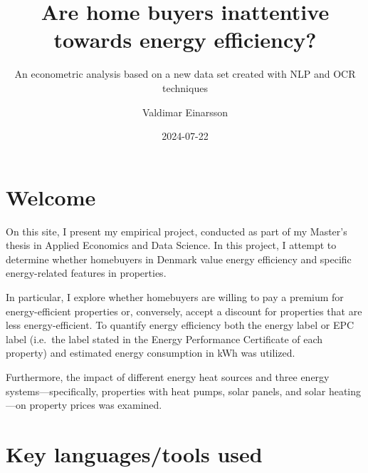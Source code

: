 \documentclass[
  letterpaper,
  DIV=11,
  numbers=noendperiod]{scrreprt}
\title{Are home buyers inattentive towards energy efficiency?}
\subtitle{An econometric analysis based on a new data set created with
NLP and OCR techniques}
\author{Valdimar Einarsson}
\date{2024-07-22}
\renewcommand*\contentsname{Table of contents}
\newcommand\contentsname{Table of contents}
\begin{document}
\maketitle

\renewcommand*\contentsname{Table of contents}
{
\hypersetup{linkcolor=}
\setcounter{tocdepth}{2}
\tableofcontents
}


\chapter*{Welcome}\label{welcome}


On this site, I present my empirical project, conducted as part of my
Master's thesis in Applied Economics and Data Science. In this project,
I attempt to determine whether homebuyers in Denmark value energy
efficiency and specific energy-related features in properties.

In particular, I explore whether homebuyers are willing to pay a premium
for energy-efficient properties or, conversely, accept a discount for
properties that are less energy-efficient. To quantify energy efficiency
both the energy label or EPC label (i.e.~the label stated in the Energy
Performance Certificate of each property) and estimated energy
consumption in kWh was utilized.

Furthermore, the impact of different energy heat sources and three
energy systems---specifically, properties with heat pumps, solar panels,
and solar heating---on property prices was examined.


\chapter*{Key languages/tools used}\label{key-languagestools-used}

\end{document}
